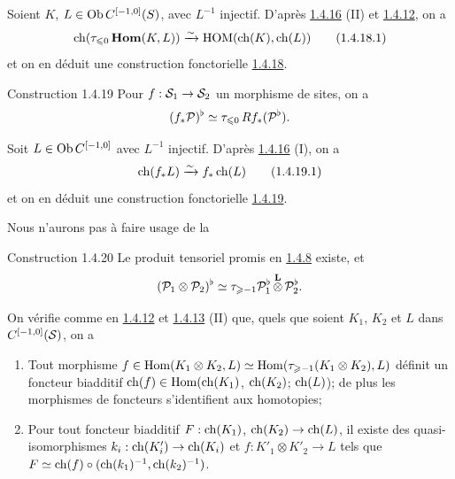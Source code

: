 \documentclass[10pt]{../fichiers-configuration-latex/smfart}
\begin{document}
Soient $K$, $L\in \operatorname{Ob} C^{[-1,0]}(S)$, avec $L^{-1}$ injectif. D'après
\hyperref[XVIII.lem1.4.16]{1.4.16} (II) et \hyperref[XVIII.subsubsec1.4.12]{1.4.12}, on a
\begin{equation*}
\operatorname{ch}(\tau_{\leqslant
0}\operatorname{\mathbf{Hom}}(K,L))\xrightarrow{\sim}\operatorname{HOM}(\operatorname{ch}(K),\operatorname{ch}(L))\tag{1.4.18.1}
\end{equation*}%
et on en déduit une construction fonctorielle \hyperref[XVIII.const1.4.18]{1.4.18}.

\begin{enonce*}[remark]{Construction 1.4.19}
Pour $f:\Ss_{1}\to\Ss_{2}$ un morphisme de sites, on a
$$
(f_{\ast}{\mathcal P})^{\flat}\simeq \tau_{\leqslant
0}\,Rf_{\ast}({\mathcal P}^{\flat}){}.
$$
\end{enonce*}

Soit $L\in \operatorname{Ob} C^{[-1,0]}$ avec $L^{-1}$ injectif. D'après
\hyperref[XVIII.lem1.4.16]{1.4.16} (I), on a 
\begin{equation*}
\operatorname{ch}(f_{\ast}L)\xrightarrow{\sim} f_{\ast}\operatorname{ch}(L)\tag{1.4.19.1}
\end{equation*}%
et on en déduit une construction fonctorielle \hyperref[XVIII.const1.4.19]{1.4.19}.

Nous n'aurons pas à faire usage de la

\begin{enonce*}[remark]{Construction 1.4.20}
Le produit tensoriel promis en \hyperref[XVIII.subsubsec1.4.8]{1.4.8} existe, et
$$
({\mathcal P}_{1}\otimes {\mathcal P}_{2})^{\flat}\simeq \tau_{\geqslant
-1}{\mathcal P}^{\flat}_{1}\mathop{\otimes}^{\mathbf{L}}{\mathcal P}^{\flat}_{2}{}.
$$
\end{enonce*}

On vérifie comme en \hyperref[XVIII.subsubsec1.4.12]{1.4.12} et
\hyperref[XVIII.lem1.4.13]{1.4.13} (II) que, quels que soient 
$K_{1}$, $K_{2}$ et $L$ dans $C^{[-1,0]}({\mathcal S})$, on a
\begin{enumerate}
\renewcommand{\theenumi}{\alph{enumi}}
\renewcommand{\labelenumi}{(\theenumi)}
\item Tout morphisme $f\in \operatorname{Hom}(K_{1}\otimes K_{2},L)\simeq
\operatorname{Hom}(\tau_{\geqslant-1}(K_{1}\otimes K_{2}),L)$ définit un foncteur
biadditif $\operatorname{ch}(f)\in \operatorname{Hom}(\operatorname{ch}(K_{1})$, $\operatorname{ch}(K_{2})$; $\operatorname{ch}(L)$); de
plus les morphismes de foncteurs s'identifient aux homotopies;

\item Pour tout foncteur biadditif $F:\operatorname{ch}(K_{1})$,
$\operatorname{ch}(K_{2})\rightarrow \operatorname{ch}(L)$, il existe des quasi-isomorphismes
$k_{i}:\operatorname{ch}(K'_{i})\rightarrow \operatorname{ch}(K_{i})$ et $f:K'_{1}\otimes
K'_{2}\rightarrow L$ tels que $F\simeq \operatorname{ch}(f)\circ
(\operatorname{ch}(k_{1})^{-1},\operatorname{ch}(k_{2})^{-1})$.
\end{enumerate}
\end{document}
